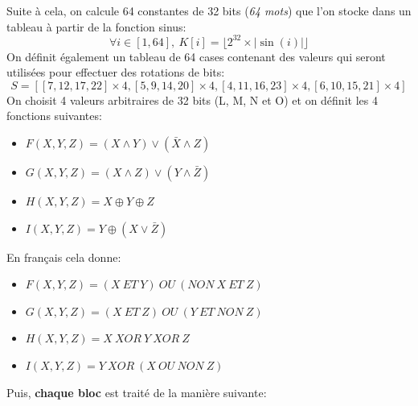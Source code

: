 \documentclass[12pt, a4paper]{article}
\begin{document}
Suite à cela, on calcule 64 constantes de 32 bits (\textit{64 mots}) que l'on stocke dans un tableau à partir de la fonction sinus:
\[
    \forall i \in [1, 64],\
    K[i] = \lfloor 2^{32} \times \left | \sin(i) \right | \rfloor
\]
On définit également un tableau de 64 cases contenant des valeurs qui seront utilisées pour effectuer des rotations de bits:
\[
    S = \left [
        [7, 12, 17, 22] \times 4, [5, 9, 14, 20] \times 4, [4, 11, 16, 23] \times 4, [6, 10, 15, 21] \times 4 \right ]
\]
On choisit 4 valeurs arbitraires de 32 bits (L, M, N et O) et on définit les 4 fonctions suivantes:
\begin{itemize}
    \item $F(X, Y, Z) = (X \wedge Y) \vee (\bar X \wedge Z)$
    \item $G(X, Y, Z) = (X \wedge Z) \vee (Y \wedge \bar Z)$
    \item $H(X, Y, Z) = X \oplus Y \oplus Z$
    \item $I(X, Y, Z) = Y \oplus (X \vee \bar Z)$
\end{itemize}
\bigskip
En français cela donne:
\begin{itemize}
    \item $F(X, Y, Z) = (X \ ET \ Y) \ OU \ (NON \ X \ ET \ Z)$
    \item $G(X, Y, Z) = (X \ ET \ Z) \ OU \ (Y \ ET \ NON \ Z)$
    \item $H(X, Y, Z) = X \ XOR \ Y \ XOR \ Z$
    \item $I(X, Y, Z) = Y \ XOR \ (X \ OU \ NON \ Z)$
\end{itemize}
\bigskip
Puis, \textbf{chaque bloc} est traité de la manière suivante:
\end{document}
